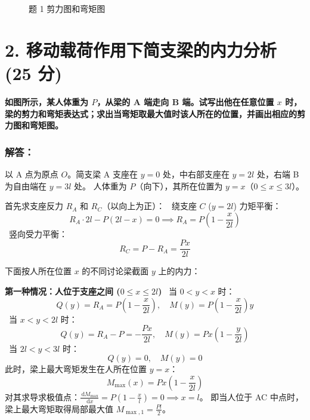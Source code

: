 \documentclass[11pt,a4paper]{ctexrep}
\newcommand{\diff}{\,\mathrm{d}}
\begin{document}
{\begin{figure}[H]
\caption{题 1 剪力图和弯矩图}
\end{figure}




\section*{2. 移动载荷作用下简支梁的内力分析 (25 分)}

\textbf{如图所示，某人体重为 $P$，从梁的 A 端走向 B 端。试写出他在任意位置 $x$ 时，梁的剪力和弯矩表达式；求出当弯矩取最大值时该人所在的位置，并画出相应的剪力图和弯矩图。}

\subsubsection*{解答：}

以 A 点为原点 $O$。简支梁 A 支座在 $y=0$ 处，中右部支座在 $y=2l$ 处，右端 B 为自由端在 $y=3l$ 处。
人体重为 $P$（向下），其所在位置为 $y=x$（$0 \le x \le 3l$）。

首先求支座反力 $R_A$ 和 $R_C$（以向上为正）：
\noindent\textbullet\ 绕支座 $C$ ($y=2l$) 力矩平衡：
  \[
  R_A \cdot 2l - P(2l-x) = 0 \implies R_A = P\left(1 - \frac{x}{2l}\right)
  \]
\noindent\textbullet\ 竖向受力平衡：
  \[
  R_C = P - R_A = \frac{Px}{2l}
  \]

下面按人所在位置 $x$ 的不同讨论梁截面 $y$ 上的内力：

\textbf{第一种情况：人位于支座之间 ($0 \le x \le 2l$)}
\noindent\textbullet\ 当 $0 < y < x$ 时：
  \[
  Q(y) = R_A = P\left(1 - \frac{x}{2l}\right), \quad M(y) = P\left(1 - \frac{x}{2l}\right)y
  \]
\noindent\textbullet\ 当 $x < y < 2l$ 时：
  \[
  Q(y) = R_A - P = -\frac{Px}{2l}, \quad M(y) = Px\left(1 - \frac{y}{2l}\right)
  \]
\noindent\textbullet\ 当 $2l < y < 3l$ 时：
  \[
  Q(y) = 0, \quad M(y) = 0
  \]
此时，梁上最大弯矩发生在人所在位置 $y=x$：
\[
M_{\max}(x) = Px\left(1 - \frac{x}{2l}\right)
\]
对其求导求极值点：$\frac{\diff M_{\max}}{\diff x} = P\left(1 - \frac{x}{l}\right) = 0 \implies x = l$。
即当人位于 AC 中点时，梁上最大弯矩取得局部最大值 $M_{\max, 1} = \frac{Pl}{2}$。

}
\end{document}
